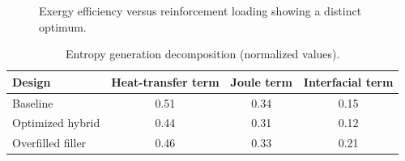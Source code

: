 \begin{figure}[htbp]
\centering
{}
\caption{Exergy efficiency versus reinforcement loading showing a distinct optimum.}
\label{fig:exergy_loading}
\end{figure}

\begin{table}[htbp]
\centering
\caption{Entropy generation decomposition (normalized values).}
\label{tab:entropy_split}
\begin{tabular}{lccc}
\toprule
Design & Heat-transfer term & Joule term & Interfacial term \\
\midrule
Baseline & 0.51 & 0.34 & 0.15 \\
Optimized hybrid & 0.44 & 0.31 & 0.12 \\
Overfilled filler & 0.46 & 0.33 & 0.21 \\
\bottomrule
\end{tabular}
\end{table}
